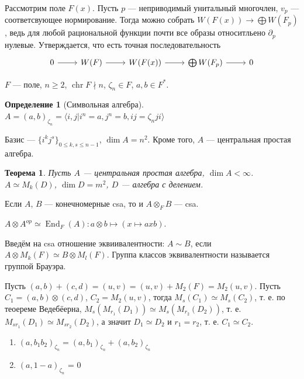 \documentclass{article}
\newtheorem*{theorem}{Теорема}
\theoremstyle{definition}
\newtheorem*{definition}{Определение}
\theoremstyle{remark}
\DeclareMathOperator{\chr}{chr}
\DeclareMathOperator{\End}{End}
\begin{document}
Рассмотрим поле $F(x)$. Пусть $p$ --- неприводимый унитальный многочлен, $v_p$ --- соответсвующее нормирование. Тогда можно собрать $W(F(x)) \rightarrow \bigoplus W(F_p)$, ведь для любой рациональной функции почти все образы относитльено $\partial_p$ нулевые. Утверждается, что есть точная последовательность
\begin{equation*}
\begin{tikzcd}
    0 \rar & W(F) \rar & W(F(x)) \rar & \bigoplus W(F_p) \rar & 0
\end{tikzcd}
\end{equation*}

$F$ --- поле, $n \geq 2$, $\chr F \nmid n$, $\zeta_n \in F$, $a, b \in F^*$.

\begin{definition}[Символьная алгебра]
    $A = (a, b)_{\zeta_n} = \langle i, j| i^n = a, j^n = b, ij = \zeta_n ji \rangle$
\end{definition}

Базис --- $\{i^k j^s\}_{0 \leq k, s \leq n - 1}$, $\dim A = n^2$. Кроме того, $A$ --- центральная простая алгебра.

\begin{theorem}
    Пусть $A$ --- центральная простая алгебра, $\dim A < \infty$. $A \simeq M_k(D)$, $\dim D = m^2$, $D$ --- алгебра с делением.
\end{theorem}

Если $A$, $B$ --- конечномерные csa, то и $A \otimes_F B$ --- csa.

$A \otimes A^{op} \simeq \End_F(A): a \otimes b \mapsto (x \mapsto axb)$.

Введём на csa отношение эквиивалентности: $A \sim B$, если $A \otimes M_k(F) \simeq B \otimes M_l(F)$. Группа классов эквивалентности называется группой Брауэра.

Пусть $(a, b) + (c, d) = (u, v) = (u, v) + M_2(F) = M_2(u, v)$. Пусть $C_1 = (a, b) \otimes (c, d)$, $C_2 = M_2(u, v)$, тогда $M_s(C_1) \simeq M_s(C_2)$, т. е. по теоереме Ведебёерна, $M_s(M_{r_1}(D_1)) \simeq M_s(M_{r_2}(D_2))$, т. е. $M_{sr_1}(D_1) \simeq M_{sr_2}(D_2)$, а значит $D_1 \simeq D_2$ и $r_1 = r_2$, т. е. $C_1 \simeq C_2$.

\begin{enumerate}
    \item $(a, b_1b_2)_{\zeta_n} = (a, b_1)_{\zeta_n} + (a, b_2)_{\zeta_n}$
    \item $(a, 1 - a)_{\zeta_n}$ = 0
\end{enumerate}
\end{document}
